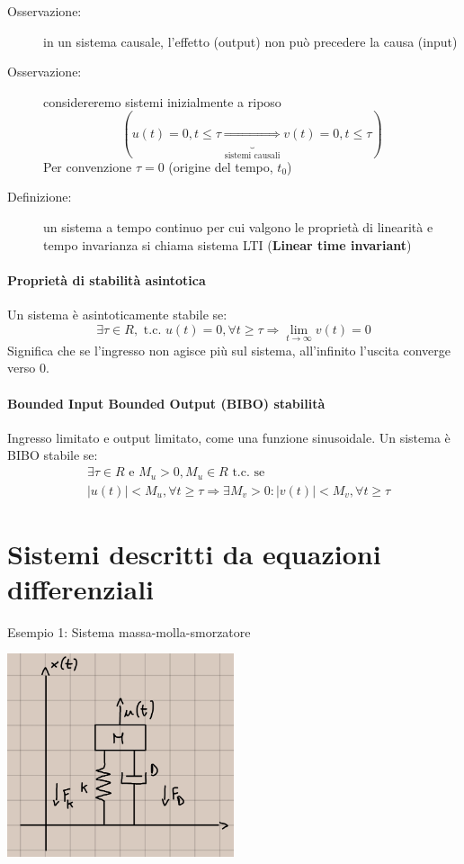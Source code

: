 \documentclass[a4paper, 12pt]{book}
\theoremstyle{plain}
\begin{document}
\begin{description}
    \item[Osservazione: ] in un sistema causale, l'effetto (output) non può precedere la causa (input) 
    \item[Osservazione: ] considereremo sistemi inizialmente a riposo 
    \[
        (u(t) = 0, t \le \tau \underbrace{\Rightarrow}_{\textrm{sistemi causali}} v(t) = 0, t \le \tau)
    \]  
    Per convenzione $\tau = 0$ (origine del tempo, $t_0$)
    \item[Definizione: ] un sistema a tempo continuo per cui valgono le proprietà di linearità e tempo invarianza si chiama
     sistema LTI (\textbf{Linear time invariant}) 
\end{description}

\paragraph{Proprietà di stabilità asintotica}

Un sistema è asintoticamente stabile se:
\[
        \exists \tau \in R, \textrm{ t.c. } u(t) = 0, \forall t \ge \tau \Rightarrow \lim_{t \rightarrow \infty} v(t) = 0
\]
Significa che se l'ingresso non agisce più sul sistema, all'infinito l'uscita converge verso $0$.

\paragraph{Bounded Input Bounded Output (BIBO) stabilità}

Ingresso limitato e output limitato, come una funzione sinusoidale. Un sistema è BIBO stabile se:
\[
    \begin{split}
        &\exists \tau \in R \textrm{ e } M_u > 0, M_u \in R \textrm{ t.c. se } \\
        &|u(t)| < M_u, \forall t \ge \tau \Rightarrow \exists M_v > 0: |v(t)| < M_v, \forall t \ge \tau 
    \end{split}
\]

\section{Sistemi descritti da equazioni differenziali}

Esempio 1: Sistema massa-molla-smorzatore

\begin{center}
    \includegraphics[width=0.5\textwidth]{molla.jpg}
\end{center}
\end{document}

